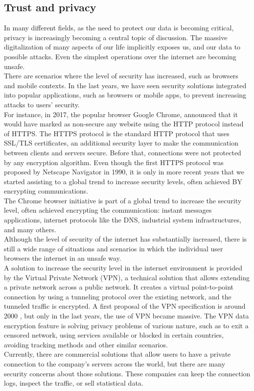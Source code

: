 \documentclass[12pt]{article}
\begin{document}
	\subsection{Trust and privacy}
	In many different fields, as the need to protect our data is becoming critical, privacy is increasingly becoming a central topic of discussion. The massive digitalization of many aspects of our life implicitly exposes us, and our data to possible attacks. Even the simplest operations over the internet are becoming unsafe.\\
	There are scenarios where the level of security has increased, such as browsers and mobile contexts. In the last years, we have seen security solutions integrated into popular applications, such as browsers or mobile apps, to prevent increasing attacks to users' security.\\
	For instance, in 2017, the popular browser Google Chrome, announced that it would have marked as non-secure any website using the HTTP protocol instead of HTTPS. The HTTPS protocol is the standard HTTP protocol that uses SSL/TLS certificates, an additional security layer to make the communication between clients and servers secure. Before that, connections were not protected by any encryption algorithm.
	Even though the first HTTPS protocol was proposed by Netscape Navigator \cite{HTTPS} in 1990, it is only in more recent years that we started assisting to a global trend to increase security levels, often achieved BY encrypting communications.\\
	The Chrome browser initiative is part of a global trend to increase the security level, often achieved encrypting the communication: instant messages applications, internet protocols like the DNS, industrial system infrastructures, and many others.\\
	\bigbreak
	Although the level of security of the internet has substantially increased, there is still a wide range of situations and scenarios in which the individual user browsers the internet in an unsafe way.\\
	A solution to increase the security level in the internet environment is provided by the Virtual Private Network (VPN), a technical solution that allows extending a private network across a public network. It creates a virtual point-to-point connection by using a tunneling protocol over the existing network, and the tunneled traffic is encrypted. A first proposal of the VPN specification is around 2000 \cite{VPNRFC}, but only in the last years, the use of VPN became massive. The VPN data encryption feature is solving privacy problems of various nature, such as to exit a censored network, using services available or blocked in certain countries, avoiding tracking methods and other similar scenarios.\\
	Currently, there are commercial solutions that allow users to have a private connection to the company's servers across the world, but there are many security concerns about those solutions. These companies can keep the connection logs, inspect the traffic, or sell statistical data.\\
    
\end{document}
